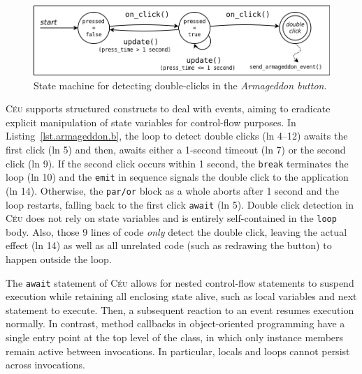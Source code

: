 \documentclass[10pt, conference, compsocconf]{IEEEtran}
\newcommand{\CEU}{\textsc{C\'{e}u}\xspace}
\newcommand{\code}[1] {{\small{\texttt{#1}}}}
\begin{document}
\begin{figure}
\centering
\includegraphics[width=\columnwidth]{double-click}
\caption{State machine for detecting double-clicks in the
         \emph{Armageddon button}.
\label{fig.armageddon.fsm}
}
\end{figure}

\CEU supports structured constructs to deal with events, aiming to eradicate
explicit manipulation of state variables for control-flow purposes.
%
In Listing~\ref{lst.armageddon.b}, the loop to detect double clicks (ln 4--12)
awaits the first click (ln 5) and then, awaits either a 1-second timeout (ln 7)
or the second click (ln 9).
If the second click occurs within 1 second, the \code{break} terminates the
loop (ln 10) and the \code{emit} in sequence signals the double click to the
application (ln 14).
Otherwise, the \code{par/or} block as a whole aborts after 1 second  and the
loop restarts, falling back to the first click \code{await} (ln 5).
%
Double click detection in \CEU does not rely on state variables and is entirely
self-contained in the \code{loop} body.
Also, those 9 lines of code \emph{only} detect the double click, leaving the
actual effect (ln 14) as well as all unrelated code (such as redrawing the
button) to happen outside the loop.

The \code{await} statement of \CEU allows for nested control-flow statements to
suspend execution while retaining all enclosing state alive, such as local
variables and next statement to execute.
Then, a subsequent reaction to an event resumes execution normally.
In contrast, method callbacks in object-oriented programming have a single
entry point at the top level of the class, in which only instance members
remain active between invocations.
In particular, locals and loops cannot persist across invocations.
\end{document}
